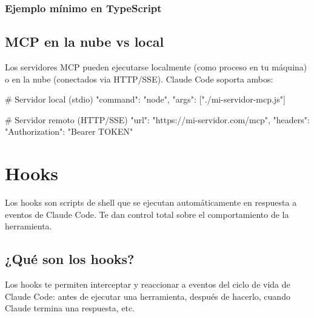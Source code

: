 \documentclass[11pt,a4paper]{book}
\begin{document}
\subsection{Ejemplo mínimo en TypeScript}
\section{MCP en la nube vs local}
Los servidores MCP pueden ejecutarse localmente (como proceso en tu máquina) o en la nube (conectados via HTTP/SSE). Claude Code soporta ambos:

\begin{codebox}
# Servidor local (stdio)
{
  "command": "node",
  "args": ["./mi-servidor-mcp.js"]
}

# Servidor remoto (HTTP/SSE)
{
  "url": "https://mi-servidor.com/mcp",
  "headers": { "Authorization": "Bearer TOKEN" }
}
\end{codebox}
\chapter{Hooks}
Los hooks son scripts de shell que se ejecutan automáticamente en respuesta a eventos de Claude Code. Te dan control total sobre el comportamiento de la herramienta.

\section{¿Qué son los hooks?}
Los hooks te permiten interceptar y reaccionar a eventos del ciclo de vida de Claude Code: antes de ejecutar una herramienta, después de hacerlo, cuando Claude termina una respuesta, etc.
\end{document}
